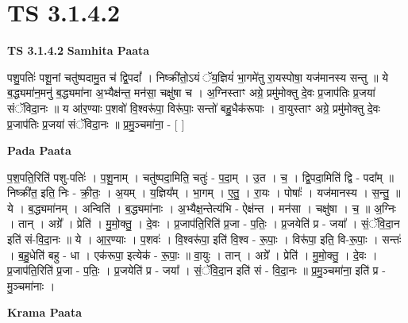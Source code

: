 \documentclass[17pt]{extarticle}
\begin{document}
\section{ TS 3.1.4.2 }

\textbf{TS 3.1.4.2 } \newline
\textbf{Samhita Paata} \newline

पशु॒पतिः॑ पशू॒नां चतु॑ष्पदामु॒त च॑ द्वि॒पदां᳚ । निष्क्री॑तो॒ऽयं ॅय॒ज्ञियं॑ भा॒गमे॑तु रा॒यस्पोषा॒ यज॑मानस्य सन्तु ॥ ये ब॒द्ध्यमा॑न॒मनु॑ ब॒द्ध्यमा॑ना अ॒भ्यैक्ष॑न्त॒ मन॑सा॒ चक्षु॑षा च । अ॒ग्निस्ताꣳ अग्रे॒ प्रमु॑मोक्तु दे॒वः प्र॒जाप॑तिः प्र॒जया॑ संॅविदा॒नः ॥ य आ॑र॒ण्याः प॒शवो॑ वि॒श्वरू॑पा॒ विरू॑पाः॒ सन्तो॑ बहु॒धैक॑रूपाः । वा॒युस्ताꣳ अग्रे॒ प्रमु॑मोक्तु दे॒वः प्र॒जाप॑तिः प्र॒जया॑ संॅविदा॒नः ॥ प्र॒मु॒ञ्चमा॑ना॒ - [  ] \newline

\textbf{Pada Paata} \newline

प॒श॒पति॒रिति॑ पशु-पतिः॑ । प॒शू॒नाम् । चतु॑ष्पदा॒मिति॒ चतुः॑ - प॒दा॒म् । उ॒त । च॒ । द्वि॒पदा॒मिति॑ द्वि - पदा᳚म् ॥ निष्क्री॑त॒ इति॒ निः - क्री॒तः॒ । अ॒यम् । य॒ज्ञिय᳚म् । भा॒गम् । ए॒तु॒ । रा॒यः । पोषाः᳚ । यज॑मानस्य । स॒न्तु॒ ॥ ये । ब॒द्ध्यमा॑नम् । अन्विति॑ । ब॒द्ध्यमा॑नाः । अ॒भ्यैक्ष॒न्तेत्य॑भि - ऐक्ष॑न्त । मन॑सा । चक्षु॑षा । च॒ ॥ अ॒ग्निः । तान् । अग्रे᳚ । प्रेति॑ । मु॒मो॒क्तु॒ । दे॒वः । प्र॒जाप॑ति॒रिति॑ प्र॒जा - प॒तिः॒ । प्र॒जयेति॑ प्र - जया᳚ । सं॒ॅवि॒दा॒न इति॑ सं-वि॒दा॒नः ॥ ये । आ॒र॒ण्याः । प॒शवः॑ । वि॒श्वरू॑पा॒ इति॑ वि॒श्व - रू॒पाः॒ । विरू॑पा॒ इति॒ वि-रू॒पाः॒ । सन्तः॑ । ब॒हु॒धेति॑ बहु - धा । एक॑रूपा॒ इत्येक॑ - रू॒पाः॒ ॥ वा॒युः । तान् । अग्रे᳚ । प्रेति॑ । मु॒मो॒क्तु॒ । दे॒वः । प्र॒जाप॑ति॒रिति॑ प्र॒जा - प॒तिः॒ । प्र॒जयेति॑ प्र - जया᳚ । सं॒ॅवि॒दा॒न इति॑ सं - वि॒दा॒नः ॥ प्र॒मु॒ञ्चमा॑ना॒ इति॑ प्र - मु॒ञ्चमा॑नाः ।  \newline


\textbf{Krama Paata} \newline
\end{document}
